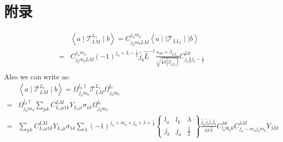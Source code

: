 \documentclass[a4paper]{article}
\newcommand{\no}{\nonumber}
\begin{document}
\section{附录}
\begin{align}
\no&\left<a\mid\mathcal{T}_{LM}^{L_{1}}\mid b\right>=C_{j_{b}m_{b}LM}^{j_{a}m_{a}}\left<a \mid\mid \mathcal{T}_{LL_{1}}\mid\mid b\right>\\
=&C_{j_{b}m_{b}LM}^{j_{a}m_{a}}(-1)^{j_{a}+L-\frac{1}{2}}\hat{j}_{b}\hat{L}^{-1}\frac{\kappa_{ab}+\beta_{LL_{1}}}{\sqrt{4\pi\left|\beta_{LL_{1}}\right|}}C_{j_{a}\frac{1}{2}j_{b}-\frac{1}{2}}^{L0}\\
\end{align}
Also we can write as:
\begin{align}
\no&\left<a\mid \mathcal{T}_{LM}^{L_{1}}\mid b\right>=\Omega_{j_{a}m_{a}}^{l_{a}\dag}\mathcal{T}_{LM}^{L_{1}}\Omega_{j_{b}m_{b}}^{l_{b}}\\
=&\Omega_{j_{a}m_{a}}^{l_{a}\dag}\sum_{\mu k}C_{L_{1}\mu1 k}^{LM}Y_{L_{1}\mu}\sigma_{1k}\Omega_{j_{b}m_{b}}^{l_{b}}\\
=&\sum_{\mu k}C_{L_{1}\mu 1k}^{LM}Y_{L_{1}\mu}\sigma_{1k}\sum_{\lambda}(-1)^{j_{a}+m_{a}+j_{b}+\lambda+\frac{1}{2}}\left\{\begin{array}{ccc}l_{a}&l_{b}&\lambda\\j_{b}&j_{a}&\frac{1}{2}\end{array}\right\}\frac{\hat{j}_{a}\hat{j}_{b}\hat{l}_{a}\hat{l}_{b}}{4\pi \hat{\lambda}}C_{l_{a}0l_{b}0}^{\lambda0}C_{j_{a}-m_{a}j_{b}m_{b}}^{\lambda M}Y_{\lambda M}
\end{align}
\end{document}
